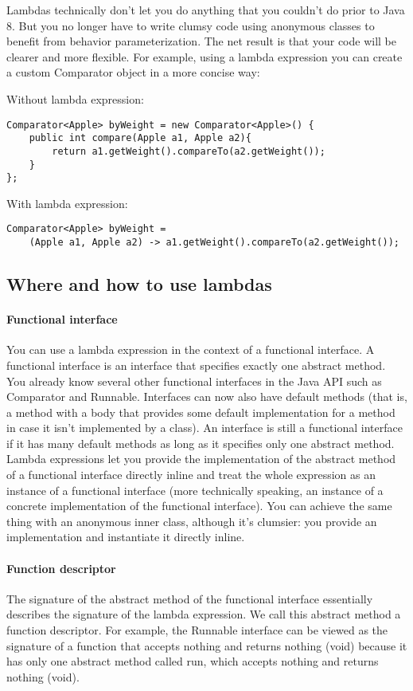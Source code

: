 Lambdas technically don’t let you do anything that you couldn’t do prior to Java 8. But you no longer have to write clumsy code using anonymous classes to benefit from behavior parameterization. The net result is that your code will be clearer and more flexible. For example, using a lambda expression you can create a custom Comparator object in a more concise way:

Without lambda expression:

\begin{lstlisting}
Comparator<Apple> byWeight = new Comparator<Apple>() {
    public int compare(Apple a1, Apple a2){
        return a1.getWeight().compareTo(a2.getWeight());
    }
};
\end{lstlisting}

With lambda expression:
\begin{lstlisting}
Comparator<Apple> byWeight =
    (Apple a1, Apple a2) -> a1.getWeight().compareTo(a2.getWeight());
\end{lstlisting}

\subsection{Where and how to use lambdas}

\paragraph{Functional interface} You can use a lambda expression in the context of a functional interface. A functional interface is an interface that specifies exactly one abstract method. You already know several other functional interfaces in the Java API such as Comparator and Runnable. Interfaces can now also have default methods (that is, a method with a body that provides some default implementation for a method in case it isn’t implemented by a class). An interface is still a functional interface if it has many default methods as long as it specifies only one abstract method. Lambda expressions let you provide the implementation of the abstract method of a functional interface directly inline and treat the whole expression as an instance of a functional interface (more technically speaking, an instance of a concrete implementation of the functional interface). You can achieve the same thing with an anonymous inner class, although it’s clumsier: you provide an implementation and instantiate it directly inline.

\paragraph{Function descriptor} The signature of the abstract method of the functional interface essentially describes the signature of the lambda expression. We call this abstract method a function descriptor. For example, the Runnable interface can be viewed as the signature of a function that accepts nothing and returns nothing (void) because it has only one abstract method called run, which accepts nothing and returns nothing (void). \cite{urma2014java}


